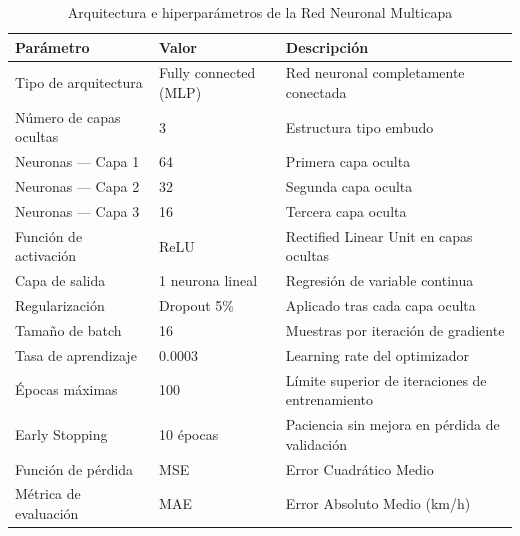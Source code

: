 \documentclass[esp]{SpeedEstimationAI_paper}
\begin{document}
\begin{table}[H]
\caption{Arquitectura e hiperparámetros de la Red Neuronal Multicapa}
\label{tab:tabMLP}
\centering
\footnotesize
\setlength{\tabcolsep}{2pt}
\renewcommand{\arraystretch}{1.05}

\begin{tabularx}{\columnwidth}{|p{3.2cm}|p{2.2cm}|X|}
\hline
\textbf{Parámetro} &
\textbf{Valor} &
\textbf{Descripción} \\
\hline

Tipo de arquitectura &
Fully connected (MLP) &
Red neuronal completamente conectada \\
\hline

Número de capas ocultas &
3 &
Estructura tipo embudo \\
\hline

Neuronas — Capa 1 &
64 &
Primera capa oculta \\
\hline

Neuronas — Capa 2 &
32 &
Segunda capa oculta \\
\hline

Neuronas — Capa 3 &
16 &
Tercera capa oculta \\
\hline

Función de activación &
ReLU &
Rectified Linear Unit en capas ocultas \\
\hline

Capa de salida &
1 neurona lineal &
Regresión de variable continua \\
\hline

Regularización &
Dropout 5\% &
Aplicado tras cada capa oculta \\
\hline

Tamaño de batch &
16 &
Muestras por iteración de gradiente \\
\hline

Tasa de aprendizaje &
0.0003 &
Learning rate del optimizador \\
\hline

Épocas máximas &
100 &
Límite superior de iteraciones de entrenamiento \\
\hline

Early Stopping &
10 épocas &
Paciencia sin mejora en pérdida de validación \\
\hline

Función de pérdida &
MSE &
Error Cuadrático Medio \\
\hline

Métrica de evaluación &
MAE &
Error Absoluto Medio (km/h) \\
\hline

\end{tabularx}
\end{table}
\end{document}
